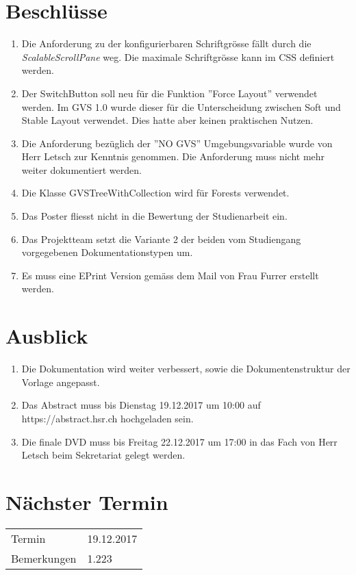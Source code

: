 \documentclass[11pt, a4paper,oneside]{scrartcl}
\begin{document}
	\section{Beschlüsse}
	\begin{enumerate}
		\item Die Anforderung zu der konfigurierbaren Schriftgrösse fällt durch die \textit{ScalableScrollPane} weg. Die maximale Schriftgrösse kann im CSS definiert werden.
		\item Der SwitchButton soll neu für die Funktion ''Force Layout'' verwendet werden. Im GVS 1.0 wurde dieser für die Unterscheidung zwischen Soft und Stable Layout verwendet. Dies hatte aber keinen praktischen Nutzen.
		\item Die Anforderung bezüglich der ''NO GVS'' Umgebungsvariable wurde von Herr Letsch zur Kenntnis genommen. Die Anforderung muss nicht mehr weiter dokumentiert werden.
		\item Die Klasse GVSTreeWithCollection wird für Forests verwendet.
		\item Das Poster fliesst nicht in die Bewertung der Studienarbeit ein.
		\item Das Projektteam setzt die Variante 2 der beiden vom Studiengang vorgegebenen Dokumentationstypen um.
		\item Es muss eine EPrint Version gemäss dem Mail von Frau Furrer erstellt werden.
	\end{enumerate}
	
	\section{Ausblick}
	\begin{enumerate}
		\item Die Dokumentation wird weiter verbessert, sowie die Dokumentenstruktur der Vorlage angepasst.
		\item Das Abstract muss bis Dienstag 19.12.2017 um 10:00 auf https://abstract.hsr.ch hochgeladen sein.
		\item Die finale DVD muss bis Freitag 22.12.2017 um 17:00 in das Fach von Herr Letsch beim Sekretariat gelegt werden.
	\end{enumerate}
	
	\section{Nächster Termin}
	\begin{tabu} to \linewidth {l X }
		\toprule
		Termin & 19.12.2017  \\
		Bemerkungen & 1.223 \\
		\bottomrule
	\end{tabu}
	
\end{document}
